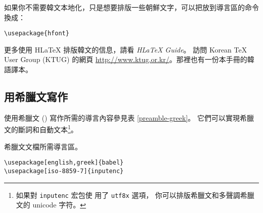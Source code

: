 如果你不需要韓文本地化，只是想要排版一些朝鮮文字，可以把放到導言區的命令換成：
\begin{lscommand}
\verb+\usepackage{hfont}+
\end{lscommand}

更多使用 H\LaTeX{} 排版韓文的信息，請看 \emph{H\LaTeX{} Guide}。
訪問 Korean \TeX{} User Group
(KTUG) 的網頁 \url{http://www.ktug.or.kr/}。那裡也有一份本手冊的韓語譯本。

\subsection{用希臘文寫作}
使用希臘文 () 寫作所需的導言內容參見表 \ref{preamble-greek}。
它們可以實現希臘文的斷詞和自動文本\footnote{如果對 \texttt{inputenc} 宏包使
用了 \texttt{utf8x} 選項，
你可以排版希臘文和多聲調希臘文的 unicode 字符。}。

\begin{table}[hbtp]
\caption{希臘文文檔所需導言區。} \label{preamble-greek}
\begin{lined}{7cm}
\begin{verbatim}
\usepackage[english,greek]{babel}
\usepackage[iso-8859-7]{inputenc}
\end{verbatim}
\smallskip
\end{lined}
\end{table}

